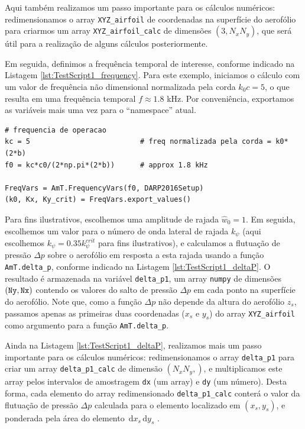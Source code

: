 \documentclass[a4paper, 11pt, twoside]{article}
\newcommand{\ud}{\,\mathrm{d}}
\begin{document}
Aqui também realizamos um passo importante para os cálculos numéricos: redimensionamos o array \verb|XYZ_airfoil| de coordenadas na superfície do aerofólio para criarmos um array \verb|XYZ_airfoil_calc| de dimensões $(3, N_x N_y)$, que será útil para a realização de alguns cálculos posteriormente.

Em seguida, definimos a frequência temporal de interesse, conforme indicado na Listagem \ref{lst:TestScript1_frequency}. Para este exemplo, iniciamos o cálculo com um valor de frequência não dimensional normalizada pela corda $k_0 c = 5$, o que resulta em uma frequência temporal $f \approx 1.8$ kHz. Por conveniência, exportamos as variáveis mais uma vez para o ``namespace'' atual.

\begin{lstlisting}[caption={Script de teste 1 - definindo a frequência},label={lst:TestScript1_frequency}]
# frequencia de operacao
kc = 5                          # freq normalizada pela corda = k0*(2*b)
f0 = kc*c0/(2*np.pi*(2*b))      # approx 1.8 kHz

FreqVars = AmT.FrequencyVars(f0, DARP2016Setup)
(k0, Kx, Ky_crit) = FreqVars.export_values()
\end{lstlisting}

Para fins ilustrativos, escolhemos uma amplitude de rajada $\hat{w}_0=1$. Em seguida, escolhemos um valor para o número de onda lateral de rajada $k_\psi$ (aqui escolhemos $k_\psi = 0.35 k_\psi^{crit}$ para fins ilustrativos), e calculamos a flutuação de pressão $\Delta p$ sobre o aerofólio em resposta a esta rajada usando a função \verb|AmT.delta_p|, conforme indicado na Listagem \ref{lst:TestScript1_deltaP}. O resultado é armazenada na variável \verb|delta_p1|, um array \verb|numpy| de dimensões $(\verb|Ny|, \verb|Nx|)$ contendo os valores do salto de pressão $\Delta p$ em cada ponto na superfície do aerofólio. Note que, como a função $\Delta p$ não depende da altura do aerofólio $z_s$, passamos apenas as primeiras duas coordenadas ($x_s$ e $y_s$) do array \verb|XYZ_airfoil| como argumento para a função \verb|AmT.delta_p|.

Ainda na Listagem \ref{lst:TestScript1_deltaP}, realizamos mais um passo importante para os cálculos numéricos: redimensionamos o array \verb|delta_p1| para criar um array \verb|delta_p1_calc| de dimensão $(N_x N_y,)$, e multiplicamos este array pelos intervalos de amostragem \verb|dx| (um array) e \verb|dy| (um número). Desta forma, cada elemento do array redimensionado \verb|delta_p1_calc| conterá o valor da flutuação de pressão $\Delta p$ calculada para o elemento localizado em $(x_s, y_s)$, e ponderada pela área do elemento $\ud x_s \ud y_s$ .
\end{document}
